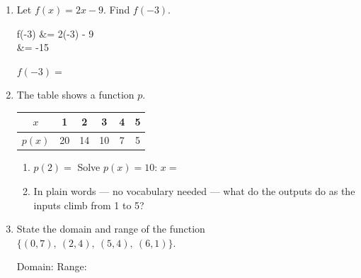 \documentclass[10pt]{article}
\begin{document}

\vspace{0.12in}

\begin{enumerate}[itemsep=12pt]

\item Let $f(x) = 2x - 9$. Find $f(-3)$.

\begin{work}
  f(-3) &= 2(-3) - 9 \\
        &= -15
\end{work}

$f(-3) = $ 

\item The table shows a function $p$.

\smallskip
\renewcommand{\arraystretch}{1.4}
\begin{tabular}{|c|c|c|c|c|c|}
\hline
$x$ & 1 & 2 & 3 & 4 & 5 \\
\hline
$p(x)$ & 20 & 14 & 10 & 7 & 5 \\
\hline
\end{tabular}
\smallskip

\begin{enumerate}[label=(\alph*), itemsep=6pt]
  \item $p(2) = $  \qquad Solve $p(x) = 10$: \quad $x = $ 
  \item In plain words --- no vocabulary needed --- what do the outputs do as
        the inputs climb from 1 to 5?

        \vspace{0.05in}
\end{enumerate}

\item State the domain and range of the function
      $\{(0, 7),\ (2, 4),\ (5, 4),\ (6, 1)\}$.

\vspace{0.05in}
Domain:  \qquad Range: 

\end{enumerate}
\end{document}
